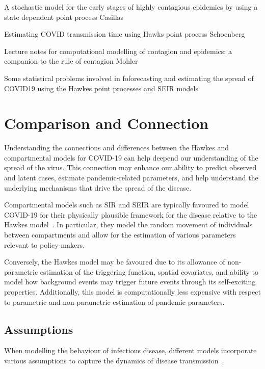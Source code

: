 \documentclass[12pt]{article}
\begin{document}
A stochastic model for the early stages of highly contagious epidemics by using a state dependent point process
Casillas


Estimating COVID transmission time using Hawks point process
Schoenberg


Lecture notes for computational modelling of contagion and epidemics: a companion to the rule of contagion 
Mohler


Some statistical problems involved in foforecasting and estimating the spread of COVID19 using the Hawkes point processes and SEIR models






\section{Comparison and Connection}

Understanding the connections and differences between the Hawkes and compartmental models for COVID-19 can help deepend our understanding of the spread of the virus. This connection may enhance our ability to predict observed and latent cases, estimate pandemic-related parameters, and help understand the underlying mechanisms that drive the spread of the disease. 

Compartmental models such as SIR and SEIR are typically favoured to model COVID-19 for their physically plausible framework for the disease relative to the Hawkes model~\cite{Kresin2022}. In particular, they model the random movement of individuals between compartments and allow for the estimation of various parameters relevant to policy-makers. 

Conversely, the Hawkes model may be favoured due to its allowance of non-parametric estimation of the triggering function, spatial covariates, and ability to model how background events may trigger future events through its self-exciting properties. Additionally, this model is computationally less expensive with respect to parametric and non-parametric estimation of pandemic parameters. 



\subsection{Assumptions}
When modelling the behaviour of infectious disease, different models incorporate various assumptions to capture the dynamics of disease transmission~\cite{Kresin2022, Lamprinakou2023}. 
\end{document}
